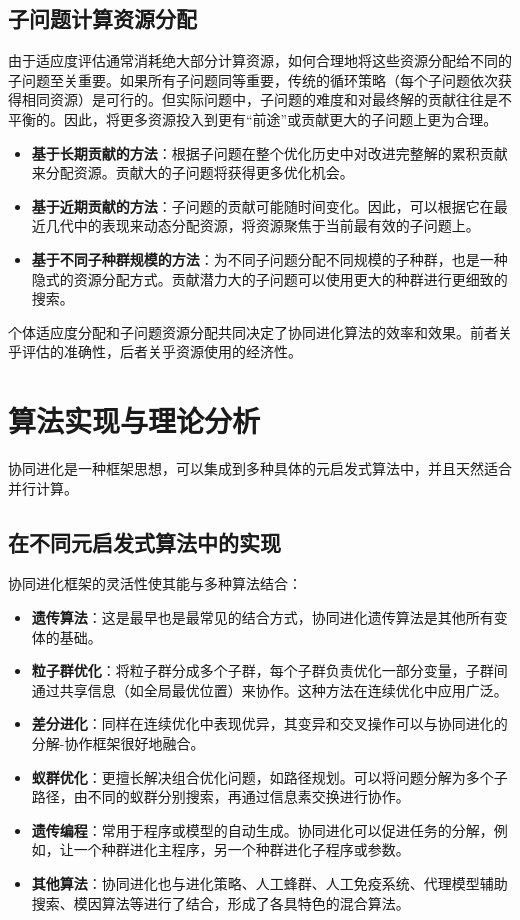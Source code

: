 \subsection{子问题计算资源分配}
由于适应度评估通常消耗绝大部分计算资源，如何合理地将这些资源分配给不同的子问题至关重要。如果所有子问题同等重要，传统的循环策略（每个子问题依次获得相同资源）是可行的。但实际问题中，子问题的难度和对最终解的贡献往往是不平衡的。因此，将更多资源投入到更有“前途”或贡献更大的子问题上更为合理。
        \begin{itemize}
            \item \textbf{基于长期贡献的方法}：根据子问题在整个优化历史中对改进完整解的累积贡献来分配资源。贡献大的子问题将获得更多优化机会。
            \item \textbf{基于近期贡献的方法}：子问题的贡献可能随时间变化。因此，可以根据它在最近几代中的表现来动态分配资源，将资源聚焦于当前最有效的子问题上。
            \item \textbf{基于不同子种群规模的方法}：为不同子问题分配不同规模的子种群，也是一种隐式的资源分配方式。贡献潜力大的子问题可以使用更大的种群进行更细致的搜索。
        \end{itemize}
个体适应度分配和子问题资源分配共同决定了协同进化算法的效率和效果。前者关乎评估的准确性，后者关乎资源使用的经济性。


\section{算法实现与理论分析}

协同进化是一种框架思想，可以集成到多种具体的元启发式算法中，并且天然适合并行计算。

\subsection{在不同元启发式算法中的实现}
协同进化框架的灵活性使其能与多种算法结合：
    \begin{itemize}
        \item \textbf{遗传算法}：这是最早也是最常见的结合方式，协同进化遗传算法是其他所有变体的基础。
        \item \textbf{粒子群优化}：将粒子群分成多个子群，每个子群负责优化一部分变量，子群间通过共享信息（如全局最优位置）来协作。这种方法在连续优化中应用广泛。
        \item \textbf{差分进化}：同样在连续优化中表现优异，其变异和交叉操作可以与协同进化的分解-协作框架很好地融合。
        \item \textbf{蚁群优化}：更擅长解决组合优化问题，如路径规划。可以将问题分解为多个子路径，由不同的蚁群分别搜索，再通过信息素交换进行协作。
        \item \textbf{遗传编程}：常用于程序或模型的自动生成。协同进化可以促进任务的分解，例如，让一个种群进化主程序，另一个种群进化子程序或参数。
        \item \textbf{其他算法}：协同进化也与进化策略、人工蜂群、人工免疫系统、代理模型辅助搜索、模因算法等进行了结合，形成了各具特色的混合算法。
    \end{itemize}

